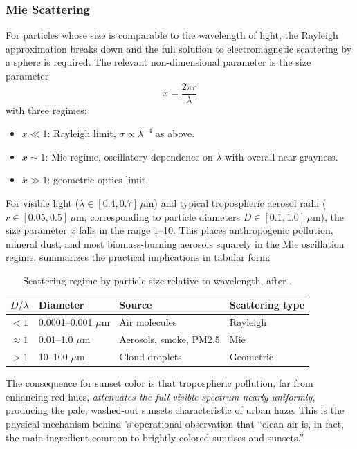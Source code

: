 \documentclass[11pt,a4paper]{article}
\begin{document}
\subsubsection{Mie Scattering}

For particles whose size is comparable to the wavelength of light, the Rayleigh approximation breaks down and the full \citet{mie1908beitrage} solution to electromagnetic scattering by a sphere is required. The relevant non-dimensional parameter is the size parameter
\begin{equation}
x = \frac{2 \pi r}{\lambda}
\label{eq:sizeparam}
\end{equation}
with three regimes:
\begin{itemize}
\item $x \ll 1$: Rayleigh limit, $\sigma \propto \lambda^{-4}$ as above.
\item $x \sim 1$: Mie regime, oscillatory dependence on $\lambda$ with overall near-grayness.
\item $x \gg 1$: geometric optics limit.
\end{itemize}

For visible light ($\lambda \in [0.4, 0.7]\,\mu\mathrm{m}$) and typical tropospheric aerosol radii ($r \in [0.05, 0.5]\,\mu\mathrm{m}$, corresponding to particle diameters $D \in [0.1, 1.0]\,\mu\mathrm{m}$), the size parameter $x$ falls in the range 1--10. This places anthropogenic pollution, mineral dust, and most biomass-burning aerosols squarely in the Mie oscillation regime. \citet[\S22.4]{stull2017practical} summarizes the practical implications in tabular form:

\begin{table}[H]
\centering
\small
\begin{tabular}{lll l}
\toprule
$D/\lambda$ & Diameter & Source & Scattering type \\
\midrule
$< 1$ & 0.0001--0.001 $\mu$m & Air molecules & Rayleigh \\
$\approx 1$ & 0.01--1.0 $\mu$m & Aerosols, smoke, PM2.5 & Mie \\
$> 1$ & 10--100 $\mu$m & Cloud droplets & Geometric \\
\bottomrule
\end{tabular}
\caption{Scattering regime by particle size relative to wavelength, after \citet[\S22.4]{stull2017practical}.}
\label{tab:stull}
\end{table}

The consequence for sunset color is that tropospheric pollution, far from enhancing red hues, \emph{attenuates the full visible spectrum nearly uniformly}, producing the pale, washed-out sunsets characteristic of urban haze. This is the physical mechanism behind \citet{corfidi2014colors}'s operational observation that ``clean air is, in fact, the main ingredient common to brightly colored sunrises and sunsets.''
\end{document}
